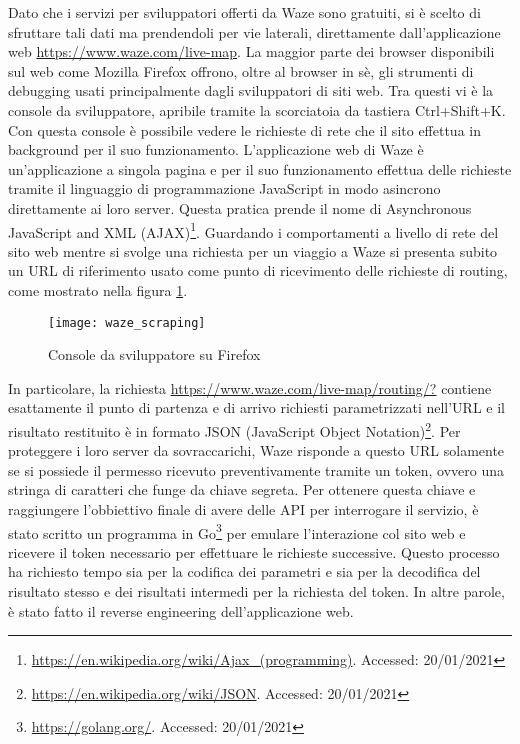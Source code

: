 Dato che i servizi per sviluppatori offerti da Waze sono gratuiti, si è scelto di sfruttare tali dati ma prendendoli per vie laterali, direttamente dall'applicazione web \url{https://www.waze.com/live-map}. La maggior parte dei browser disponibili sul web come Mozilla Firefox offrono, oltre al browser in sè, gli strumenti di debugging usati principalmente dagli sviluppatori di siti web. Tra questi vi è la console da sviluppatore, apribile tramite la scorciatoia da tastiera Ctrl+Shift+K. Con questa console è possibile vedere le richieste di rete che il sito effettua in background per il suo funzionamento. L'applicazione web di Waze è un'applicazione a singola pagina e per il suo funzionamento effettua delle richieste tramite il linguaggio di programmazione JavaScript in modo asincrono direttamente ai loro server. Questa pratica prende il nome di Asynchronous JavaScript and XML (AJAX)\footnote{\url{https://en.wikipedia.org/wiki/Ajax_(programming)}. Accessed: 20/01/2021}. Guardando i comportamenti a livello di rete del sito web mentre si svolge una richiesta per un viaggio a Waze si presenta subito un URL di riferimento usato come punto di ricevimento delle richieste di routing, come mostrato nella figura \ref{image:1}.

\begin{figure}[H]
	\texttt{[image: waze\_scraping]}
	\caption{Console da sviluppatore su Firefox}
	\label{image:1}
\end{figure}
In particolare, la richiesta \url{https://www.waze.com/live-map/routing/?} contiene esattamente il punto di partenza e di arrivo richiesti parametrizzati nell'URL e il risultato restituito è in formato JSON (JavaScript Object Notation)\footnote{\url{https://en.wikipedia.org/wiki/JSON}. Accessed: 20/01/2021}. Per proteggere i loro server da sovraccarichi, Waze risponde a questo URL solamente se si possiede il permesso ricevuto preventivamente tramite un token, ovvero una stringa di caratteri che funge da chiave segreta. Per ottenere questa chiave e raggiungere l'obbiettivo finale di avere delle API per interrogare il servizio, è stato scritto un programma in Go\footnote{\url{https://golang.org/}. Accessed: 20/01/2021} per emulare l'interazione col sito web e ricevere il token necessario per effettuare le richieste successive. Questo processo ha richiesto tempo sia per la codifica dei parametri e sia per la decodifica del risultato stesso e dei risultati intermedi per la richiesta del token. In altre parole, è stato fatto il reverse engineering dell'applicazione web.


